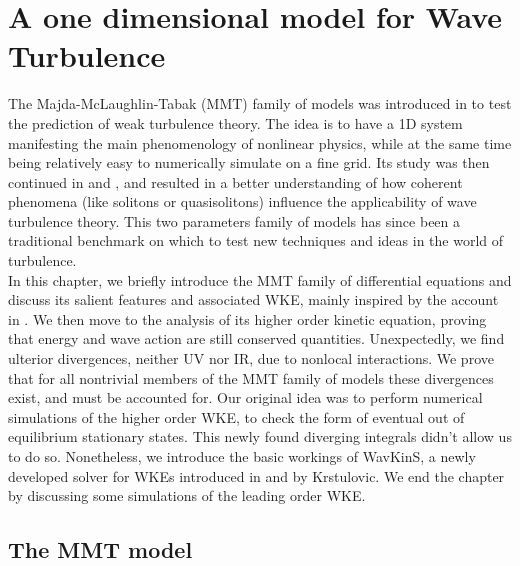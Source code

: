 

\newpage
\phantom{}
\thispagestyle{empty}
\section{A one dimensional model for Wave Turbulence}
    The Majda-McLaughlin-Tabak (MMT) family of models was introduced in \cite{Majda1997} to test the prediction of weak turbulence theory. The idea is to have a 1D system manifesting
    the main phenomenology of nonlinear physics, while at the same time being relatively easy to numerically simulate on a fine grid. Its study was then continued in
    \cite{Cai2001} and \cite{Zakharov2001}, and resulted in a better understanding of how coherent phenomena (like solitons or quasisolitons) influence the applicability 
    of wave turbulence theory. This two parameters family of models has since been a traditional benchmark on which to test new techniques and ideas in the world of turbulence. \\
    In this chapter, we briefly introduce the MMT family of differential equations and discuss its salient features and associated WKE, mainly inspired by the account in 
    \cite{ZAKHAROV2004}. We then 
    move to the analysis of its higher order kinetic equation, proving that energy and wave action are still conserved quantities. Unexpectedly,  we find 
    ulterior divergences, neither UV nor IR, due to nonlocal interactions. We prove that for all nontrivial members of the MMT family of
    models these divergences exist, and must be accounted for. Our original idea was to perform numerical simulations of the higher order WKE, to check the form of eventual out of equilibrium stationary states. This newly found diverging integrals didn't allow us to do so. Nonetheless, we introduce the basic workings of WavKinS,
    a newly developed solver for WKEs introduced in \cite{Giorgio1} and \cite{Giorgio2} by Krstulovic. We end the chapter by discussing some simulations of the leading order WKE. 
    \newpage  
    \vphantom{a}
    \subsection{The MMT model}

